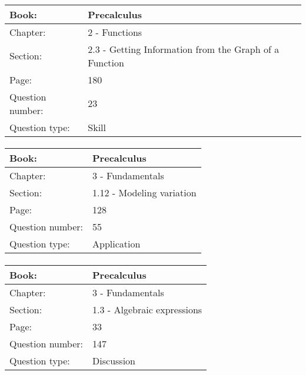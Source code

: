 \documentclass{article}
\begin{document}
   \paragraph{}
   \begin{tabularx}{1\textwidth}{
           p{}
           p{}
       }
       \toprule
       Book: & Precalculus
       \\
       \midrule
       Chapter: & 2 - Functions
       \\
       \midrule
       Section: & 2.3 - Getting Information from the Graph of a Function
       \\
       \midrule
       Page: & 180
       \\
       \midrule
       Question number: & 23
       \\
       \midrule
       Question type: & Skill
       \\
       \bottomrule
   \end{tabularx}



   \paragraph{}
   \begin{tabularx}{1\textwidth}{
           p{}
           p{}
       }
       \toprule
       Book: & Precalculus
       \\
       \midrule
       Chapter: & 3 - Fundamentals
       \\
       \midrule
       Section: & 1.12 - Modeling variation
       \\
       \midrule
       Page: & 128
       \\
       \midrule
       Question number: & 55
       \\
       \midrule
       Question type: & Application
       \\
       \bottomrule
   \end{tabularx}



   \paragraph{}
   \begin{tabularx}{1\textwidth}{
           p{}
           p{}
       }
       \toprule
       Book: & Precalculus
       \\
       \midrule
       Chapter: & 3 - Fundamentals
       \\
       \midrule
       Section: & 1.3 - Algebraic expressions
       \\
       \midrule
       Page: & 33
       \\
       \midrule
       Question number: & 147
       \\
       \midrule
       Question type: & Discussion
       \\
       \bottomrule
   \end{tabularx}
\end{document}
